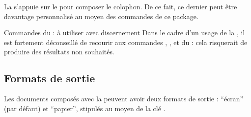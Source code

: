 La \yatCl{} s'appuie sur le  pour composer le colophon. De ce
fait, ce dernier peut être davantage personnalisé au moyen des commandes de ce
package.

\begin{dbwarning}{Commandes du  : à utiliser avec
    discernement}{}
  Dans le cadre d’un usage de la \yatCl{}, il est fortement déconseillé de
  recourir aux commandes ,
  ,  et
   du  : cela risquerait de
  produire des résultats non souhaités.
\end{dbwarning}

\subsection{Formats de sortie}
\label{sec-formats-de-sortie}
%

Les documents composés avec la \yatCl{} peuvent avoir deux formats de sortie :
\enquote{écran} (par défaut) et \enquote{papier}, stipulés au moyen de la clé
.

